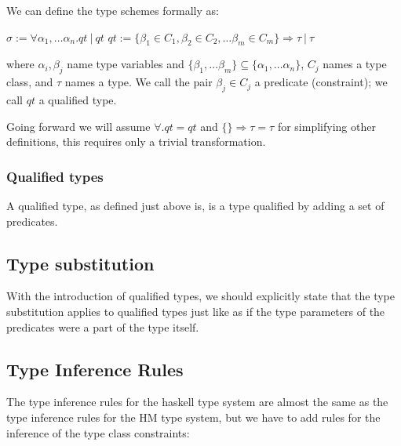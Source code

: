 We can define the type schemes formally as:

$\sigma := \forall \alpha_1, \dots \alpha_n . qt\ |\ qt$
$qt := \{\beta_1 \in C_1, \beta_2 \in C_2, \dots \beta_m \in C_m\} \Rightarrow \tau\ |\ \tau$

where $\alpha_i, \beta_j$ name type variables and $\{\beta_1, \dots \beta_m\} \subseteq \{\alpha_1, \dots \alpha_n\}$, $C_j$ names a type class, and $\tau$ names a type. We call the pair $\beta_j \in C_j$ a predicate (constraint); we call $qt$ a qualified type. %

Going forward we will assume $\forall . qt = qt$ and $\{\} \Rightarrow \tau = \tau$ for simplifying other definitions, this requires only a trivial transformation. %

\subsubsection{Qualified types}

A qualified type, as defined just above is, is a type qualified by adding a set of predicates.

\subsection{Type substitution}

With the introduction of qualified types, we should explicitly state that the type substitution applies to qualified types just like as if the type parameters of the predicates were a part of the type itself.

\subsection{Type Inference Rules}

The type inference rules for the haskell type system are almost the same as the type inference rules for the HM type system, but we have to add rules for the inference of the type class constraints:

